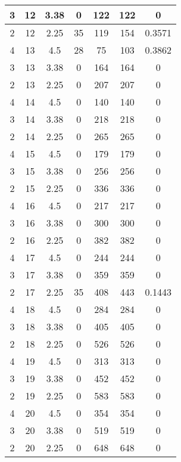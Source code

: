 \documentclass[letterpaper, 12pt]{article}
\begin{document}
\begin{longtable}{|c|c|c|c|c|c|c|}
\hline
3 & 12 & 3.38 & 0 & 122 & 122 & 0 \\
\hline
2 & 12 & 2.25 & 35 & 119 & 154 & 0.3571 \\
\hline
4 & 13 & 4.5 & 28 & 75 & 103 & 0.3862 \\
\hline
3 & 13 & 3.38 & 0 & 164 & 164 & 0 \\
\hline
2 & 13 & 2.25 & 0 & 207 & 207 & 0 \\
\hline
4 & 14 & 4.5 & 0 & 140 & 140 & 0 \\
\hline
3 & 14 & 3.38 & 0 & 218 & 218 & 0 \\
\hline
2 & 14 & 2.25 & 0 & 265 & 265 & 0 \\
\hline
4 & 15 & 4.5 & 0 & 179 & 179 & 0 \\
\hline
3 & 15 & 3.38 & 0 & 256 & 256 & 0 \\
\hline
2 & 15 & 2.25 & 0 & 336 & 336 & 0 \\
\hline
4 & 16 & 4.5 & 0 & 217 & 217 & 0 \\
\hline
3 & 16 & 3.38 & 0 & 300 & 300 & 0 \\
\hline
2 & 16 & 2.25 & 0 & 382 & 382 & 0 \\
\hline
4 & 17 & 4.5 & 0 & 244 & 244 & 0 \\
\hline
3 & 17 & 3.38 & 0 & 359 & 359 & 0 \\
\hline
2 & 17 & 2.25 & 35 & 408 & 443 & 0.1443 \\
\hline
4 & 18 & 4.5 & 0 & 284 & 284 & 0 \\
\hline
3 & 18 & 3.38 & 0 & 405 & 405 & 0 \\
\hline
2 & 18 & 2.25 & 0 & 526 & 526 & 0 \\
\hline
4 & 19 & 4.5 & 0 & 313 & 313 & 0 \\
\hline
3 & 19 & 3.38 & 0 & 452 & 452 & 0 \\
\hline
2 & 19 & 2.25 & 0 & 583 & 583 & 0 \\
\hline
4 & 20 & 4.5 & 0 & 354 & 354 & 0 \\
\hline
3 & 20 & 3.38 & 0 & 519 & 519 & 0 \\
\hline
2 & 20 & 2.25 & 0 & 648 & 648 & 0 \\
\hline
\end{longtable}
\end{document}
